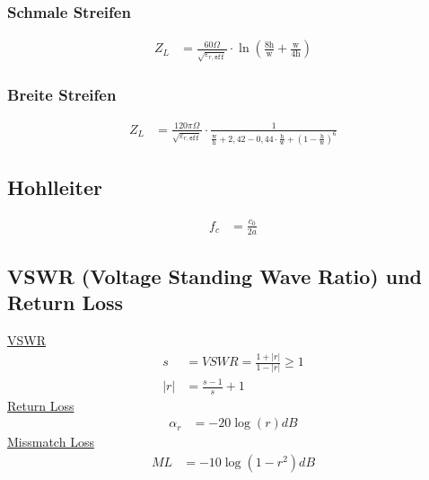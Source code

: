 \subsubsection{Schmale Streifen}
\begin{align*}
    Z_L & = \frac{60\Omega}{\sqrt{\varepsilon_{r,\texttt{eff}}}}\cdot\ln\left(\frac{8\text{h}}{\text{w}}+\frac{\mathrm{w}}{4\mathrm{h}}\right)
\end{align*}
\subsubsection{Breite Streifen}
\begin{align*}
    Z_L & = \frac{120\pi\Omega}{\sqrt{\varepsilon_{r,\texttt{eff}}}}\cdot\frac{1}{\frac{\text{w}}{\text{h}}+2,42-0,44\cdot\frac{\mathrm{h}}{\mathrm{w}}+\left(1-\frac{\mathrm{h}}{\mathrm{w}}\right)^6}
\end{align*}

\subsection{Hohlleiter}
\begin{align*}
    f_c & = \frac{c_0}{2a}
\end{align*}

\subsection{VSWR (Voltage Standing Wave Ratio) und Return Loss}
\underline{VSWR}
\begin{align*}
    s   & = VSWR = \frac{1+|r|}{1-|r|}\geq 1 \\
    |r| & = \frac{s-1}s+{1}
\end{align*}
\underline{Return Loss}
\begin{align*}
    \alpha_r & = -20\log(r)dB
\end{align*}
\underline{Missmatch Loss}
\begin{align*}
    ML & = -10\log(1-r^2)dB
\end{align*}